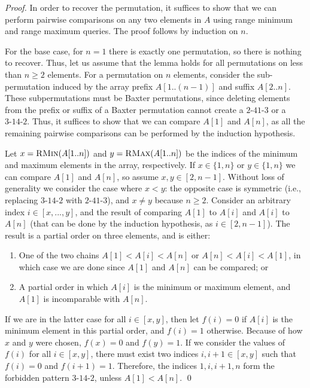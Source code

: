 \documentclass[runningheads]{llncs}
\newcommand{\forbMMOne}{3\text{-}14\text{-}2}
\newcommand{\forbMMTwo}{2\text{-}41\text{-}3}
\newcommand{\rmin}{\textsc{RMin}}
\newcommand{\rmax}{\textsc{RMax}}
\begin{document}
\begin{proof}
In order to recover the permutation, it suffices to show that we can
perform pairwise comparisons on any two elements in $A$ using range
minimum and range maximum queries. The proof follows by induction on
$n$.

For the base case, for $n=1$ there is exactly one permutation, so there
is nothing to recover. Thus, let us assume that the lemma holds for all
permutations on less than $n\geq 2$ elements.  For a permutation on $n$
elements, consider the sub-permutation induced by the array prefix
$A[1..(n-1)]$ and suffix $A[2..n]$.  These subpermutations must be
Baxter permutations, since deleting elements from the prefix or suffix
of a Baxter permutation cannot create a $\forbMMTwo$ or a $\forbMMOne$.  Thus,
it suffices to show that we can compare $A[1]$ and $A[n]$, as all
the remaining pairwise comparisons can be performed by the induction
hypothesis.

Let $x = \rmin(A[1..n])$ and $y = \rmax(A[1..n])$ be the indices of
the minimum and maximum elements in the array, respectively. If
$x\in\{1,n\}$ or $y\in\{1,n\}$ we can compare $A[1]$ and $A[n]$, so
assume $x,y\in [2,n-1]$.  Without loss of generality we consider the
case where $x < y$: the opposite case is symmetric (i.e., replacing
$\forbMMOne$ with $\forbMMTwo$), and $x\neq y$ because $n\geq
2$. Consider an arbitrary index $i \in [x,...,y]$, and the result of
comparing $A[1]$ to $A[i]$ and $A[i]$ to $A[n]$ (that can be done by
the induction hypothesis, as $i\in[2,n-1]$).  The result is a partial
order on three elements, and is either:
\begin{enumerate}
  \item One of the two chains $A[1] < A[i] < A[n]$ or $A[n] < A[i] <
    A[1]$, in which case we are done since $A[1]$ and $A[n]$ can be
    compared; or
 \item A partial order in which $A[i]$ is the minimum or maximum
   element, and $A[1]$ is incomparable with $A[n]$.
\end{enumerate}
If we are in the latter case for all $i \in [x,y]$, then let $f(i) =
0$ if $A[i]$ is the minimum element in this partial order, and $f(i) =
1$ otherwise. Because of how $x$ and $y$ were chosen, $f(x) = 0$ and
$f(y) = 1$. If we consider the values of $f(i)$ for all $i \in [x,y]$,
there must exist two indices $i,i+1 \in [x,y]$ such that $f(i)=0$ and
$f(i+1)=1$.  Therefore, the indices $1, i, i+1, n$ form the forbidden
pattern $\forbMMOne$, unless $A[1] < A[n]$.  \qed
\end{proof}
\end{document}
